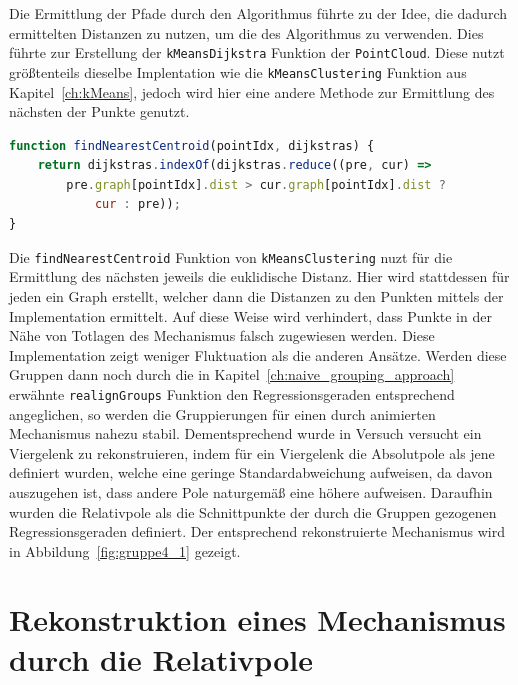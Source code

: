 Die Ermittlung der Pfade durch den  Algorithmus führte zu der Idee, die dadurch ermittelten Distanzen zu nutzen, um die  des  Algorithmus zu verwenden.
Dies führte zur Erstellung der \lstinline{kMeansDijkstra} Funktion der \lstinline{PointCloud}.
Diese nutzt grö{\ss}tenteils dieselbe Implentation wie die \lstinline{kMeansClustering} Funktion aus Kapitel~\ref{ch:kMeans}, jedoch wird hier eine andere Methode zur Ermittlung des nächsten  der Punkte genutzt.

\begin{lstlisting}[language=JavaScript, caption={Bestimmung des nächsten \name{Centroids} in der \lstinline{kMeansDijkstra} Funktion.}, label={lst:findNearestCentroidDijkstra}]
function findNearestCentroid(pointIdx, dijkstras) {
    return dijkstras.indexOf(dijkstras.reduce((pre, cur) =>
        pre.graph[pointIdx].dist > cur.graph[pointIdx].dist ?
            cur : pre));
}
\end{lstlisting}

Die \lstinline{findNearestCentroid} Funktion von \lstinline{kMeansClustering} nuzt für die Ermittlung des nächsten  jeweils die euklidische Distanz.
Hier wird stattdessen für jeden  ein Graph erstellt, welcher dann die Distanzen zu den Punkten mittels der  Implementation ermittelt.
Auf diese Weise wird verhindert, dass Punkte in der Nähe von Totlagen des Mechanismus falsch zugewiesen werden.
Diese Implementation zeigt weniger Fluktuation als die anderen Ansätze.
Werden diese Gruppen dann noch durch die in Kapitel~\ref{ch:naive_grouping_approach} erwähnte \lstinline{realignGroups} Funktion den Regressionsgeraden entsprechend angeglichen, so werden die Gruppierungen für einen durch  animierten Mechanismus nahezu stabil.
Dementsprechend wurde in Versuch  versucht ein Viergelenk zu rekonstruieren, indem für ein Viergelenk die Absolutpole als jene definiert wurden, welche eine geringe Standardabweichung aufweisen, da davon auszugehen ist, dass andere Pole naturgemä{\ss} eine höhere aufweisen.
Daraufhin wurden die Relativpole als die Schnittpunkte der durch die Gruppen gezogenen Regressionsgeraden definiert.
Der entsprechend rekonstruierte Mechanismus wird in Abbildung~\ref{fig:gruppe4_1} gezeigt.

\section{Rekonstruktion eines Mechanismus durch die Relativpole}

